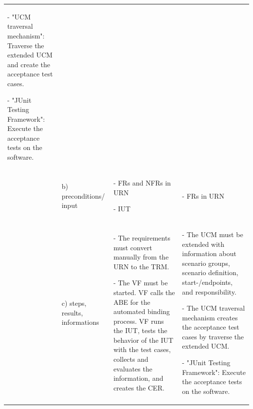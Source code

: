 \begin{landscape}
\begin{table}
\begin{longtable}[h]{|p{1.3cm}|>{\raggedright}p{2.8cm}|>{}p{9.1cm}|>{}p{9.1cm}|}
			- "UCM traversal mechanism": Traverse the extended UCM and create the acceptance test cases.
			
			- "JUnit Testing Framework": Execute the acceptance tests on the software.
			\\
			\cline{2-4}
			& b) preconditions/ input 
			&  - FRs and NFRs in URN
			
			- IUT
			& 
			- FRs in URN \\
			\cline{2-4}
			& c) steps, results, informations 
			& - The requirements must convert manually from the URN to the TRM.
			
			- The VF must be started. VF calls the ABE for the automated binding process. VF runs the IUT, tests the behavior of the IUT with the test cases, collects and evaluates the information, and creates the CER.
			&
			- The UCM must be extended with information about scenario groups, scenario definition, start-/endpoints, and responsibility.
			
			- The UCM traversal mechanism creates the acceptance test cases by traverse the extended UCM.
			
			- "JUnit Testing Framework": Execute the acceptance tests on the software.
			\\
			\hline %
		\end{longtable}
		\label{tab:08_syntheseMatrix1}
	\end{table}
\end{landscape}
\restoregeometry

